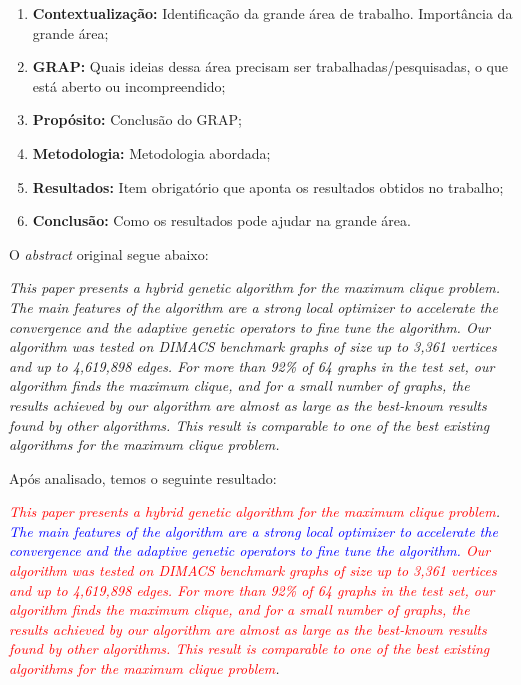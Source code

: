 \documentclass[portugues, brazil, a4paper,12pt]{article}
\begin{document}
	\begin{enumerate}
		\item \textbf{Contextualização:} Identificação da grande área de trabalho. Importância da grande área;
		
		\item \textbf{GRAP:} Quais ideias dessa área precisam ser trabalhadas/pesquisadas, o que está aberto ou incompreendido;
		
		\item \textbf{Propósito:} Conclusão do GRAP;
		
		\item \textbf{Metodologia:} Metodologia abordada;
		
		\item \textbf{Resultados:} Item obrigatório que aponta os resultados obtidos no trabalho;
		
		\item \textbf{Conclusão:} Como os resultados pode ajudar na grande área.
	\end{enumerate}
	
	O \textit{abstract} original segue abaixo:
	
	\textit{This paper presents a hybrid genetic algorithm for the maximum clique problem. The main features of the algorithm are a strong local optimizer to accelerate the convergence and the adaptive genetic operators to fine tune the algorithm. Our algorithm was tested on DIMACS benchmark graphs of size up to 3,361 vertices and up to 4,619,898 edges. For more than 92\% of 64 graphs in the test set, our algorithm finds the maximum clique, and for a small number of graphs, the results achieved by our algorithm are almost as large as the best-known results found by other algorithms. This result is comparable to one of the best existing algorithms for the maximum clique problem.}
	
	Após analisado, temos o seguinte resultado:
	
	\textit{\textcolor{red}{This paper presents a hybrid genetic algorithm for the maximum clique problem}. \textcolor{blue}{The main features of the algorithm are a strong local optimizer to accelerate the convergence and the adaptive genetic operators to fine tune the algorithm.} \textcolor{red}{Our algorithm was tested on DIMACS benchmark graphs of size up to 3,361 vertices and up to 4,619,898 edges. For more than 92\% of 64 graphs in the test set, our algorithm finds the maximum clique, and for a small number of graphs, the results achieved by our algorithm are almost as large as the best-known results found by other algorithms. This result is comparable to one of the best existing algorithms for the maximum clique problem}.}
		
\end{document}
